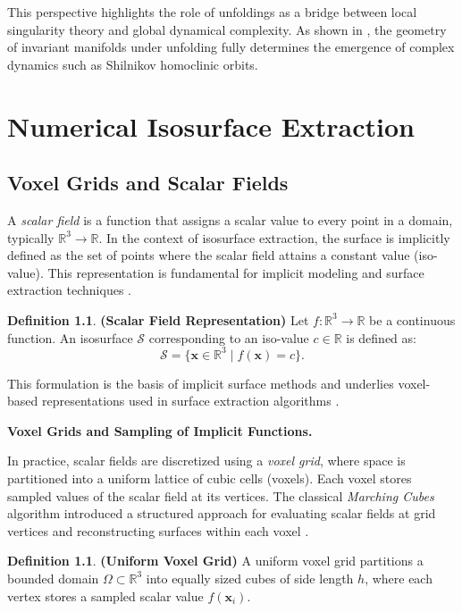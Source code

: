 \documentclass[12pt, a4paper, oneside]{book}
\theoremstyle{plain}
\theoremstyle{definition}
\newtheorem{definition}[theorem]{Definition}
\theoremstyle{remark}
\theoremstyle{definition}
\begin{document}
This perspective highlights the role of unfoldings as a bridge between local singularity theory and global dynamical complexity. As shown in \cite{ibanez2005shil}, the geometry of invariant manifolds under unfolding fully determines the emergence of complex dynamics such as Shilnikov homoclinic orbits.

\chapter{Numerical Isosurface Extraction}
\section{Voxel Grids and Scalar Fields}

A \emph{scalar field} is a function that assigns a scalar value to every point in a domain, typically $\mathbb{R}^3 \rightarrow \mathbb{R}$. In the context of isosurface extraction, the surface is implicitly defined as the set of points where the scalar field attains a constant value (iso-value). This representation is fundamental for implicit modeling and surface extraction techniques \cite{bloomenthal1997introduction}.

\begin{definition}
    \textbf{ (Scalar Field Representation)}
Let $f:\mathbb{R}^3 \rightarrow \mathbb{R}$ be a continuous function. An isosurface $\mathcal{S}$ corresponding to an iso-value $c \in \mathbb{R}$ is defined as:
\[
\mathcal{S} = \{ \mathbf{x} \in \mathbb{R}^3 \mid f(\mathbf{x}) = c \}.
\]
\end{definition}

This formulation is the basis of implicit surface methods and underlies voxel-based representations used in surface extraction algorithms \cite{bloomenthal1997introduction,lorensen1998marching}.

\vspace{0.5em}

\textbf{Voxel Grids and Sampling of Implicit Functions.}

In practice, scalar fields are discretized using a \emph{voxel grid}, where space is partitioned into a uniform lattice of cubic cells (voxels). Each voxel stores sampled values of the scalar field at its vertices. The classical \emph{Marching Cubes} algorithm introduced a structured approach for evaluating scalar fields at grid vertices and reconstructing surfaces within each voxel \cite{lorensen1998marching}.
\begin{definition}
    \textbf{(Uniform Voxel Grid)}
A uniform voxel grid partitions a bounded domain $\Omega \subset \mathbb{R}^3$ into equally sized cubes of side length $h$, where each vertex stores a sampled scalar value $f(\mathbf{x}_i)$.

\end{definition}
\end{document}
